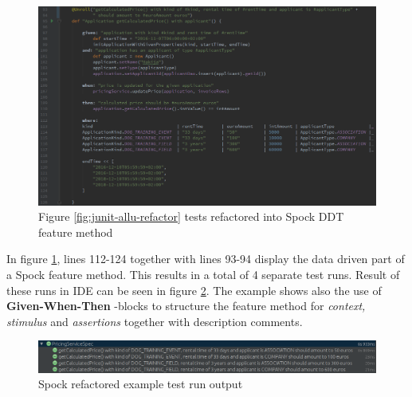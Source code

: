    \begin{figure}[H]
      \begin{center}
        \includegraphics[width=14.7cm]{images/spock-pricing-examples.png}
        \caption{Figure \ref{fig:junit-allu-refactor} tests refactored into Spock DDT feature method}
        \label{fig:spock-allu-refactor}
      \end{center}
    \end{figure}

    In figure \ref{fig:spock-allu-refactor}, lines 112-124 together with lines 93-94 display the data driven part of a Spock
    feature method. This results in a total of
    4 separate test runs. Result of these runs in IDE can be seen in figure \ref{fig:spock-allu-refactor-output}. The
    example shows also the use of \textbf{Given-When-Then} -blocks to structure the feature method for \textit{context, stimulus}
    and \textit{assertions} together with description comments.

    \begin{figure}[H]
      \begin{center}
        \includegraphics[width=14.7cm]{images/spock-pricing-results.png}
        \caption{Spock refactored example test run output}
        \label{fig:spock-allu-refactor-output}
      \end{center}
    \end{figure}

